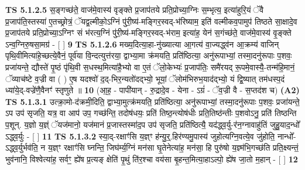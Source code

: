\documentclass[17pt]{extarticle}
\begin{document}
                  \newline
                                \textbf{ TS 5.1.2.5} \newline
                  स॒ङ्गच्छ॑ते॒ वाज॑मे॒वास्य॑ वृङ्क्ते प्र॒जाप॑तये प्रति॒प्रोच्या॒ग्निः स॒म्भृत्य॒ इत्या॑हुरि॒यं ॅवै प्र॒जाप॑ति॒स्तस्या॑ ए॒तच्छ्रोत्रं॒ ॅयद्व॒ल्मीको॒ऽग्निं पु॑री॒ष्य॑-मङ्गिर॒स्वद्-भ॑रिष्याम॒ इति॑ वल्मीकव॒पामुप॑ तिष्ठते सा॒क्षादे॒व प्र॒जाप॑तये प्रति॒प्रोच्या॒ऽग्निꣳ सं भ॑रत्य॒ग्निं पु॑री॒ष्य॑-मङ्गिर॒स्वद्-भ॑राम॒ इत्या॑ह॒ येन॑ स॒गंच्छ॑ते॒ वाज॑मे॒वास्य॑ वृ॒ङ्क्ते ऽन्व॒ग्निरु॒षसा॒मग्र॑ - [  ] \textbf{  9} \newline
                  \newline
                                \textbf{ TS 5.1.2.6} \newline
                  मख्य॒दित्या॒हा-नु॑ख्यात्या आ॒गत्य॑ वा॒ज्यद्ध्व॑न आ॒क्रम्य॑ वाजिन् पृथि॒वीमित्या॑हे॒च्छत्ये॒वैनं॒ पूर्व॑या वि॒न्दत्युत्त॑रया॒ द्वाभ्या॒मा क्र॑मयति॒ प्रति॑ष्ठित्या॒ अनु॑रूपाभ्यां॒ तस्मा॒दनु॑रूपाः प॒शवः॒ प्रजा॑यन्ते॒ द्यौस्ते॑ पृ॒ष्ठं पृ॑थि॒वी स॒धस्थ॒मित्या॑है॒भ्यो वा ए॒तं ॅलो॒केभ्यः॑ प्र॒जाप॑तिः॒ समै॑रयद् रू॒पमे॒वास्यै॒-तन्म॑हि॒मानं॒ ॅव्याच॑ष्टे व॒ज्री वा ( ) ए॒ष यदश्वो॑ द॒द्-भिर॒न्यतो॑दद्भ्यो॒ भूयां॒ ॅलोम॑भिरुभ॒याद॑द्भ्यो॒ यं द्वि॒ष्यात् तम॑धस्प॒दं ध्या॑ये॒द्-वज्रे॑णै॒वैनꣳ॑ स्तृणुते ॥ \textbf{  10 } \newline
                  \newline
                      (आ॒ह॒ - पापी॑यान् - रु॒द्रादे॒व - येना - ऽग्रं॑ - ॅव॒ज्री वै - स॒प्तद॑श च)  \textbf{(A2)} \newline \newline
                                        \textbf{ TS 5.1.3.1} \newline
                  उत्क्रा॒मो-द॑क्रमी॒दिति॒ द्वाभ्या॒मुत्क्र॑मयति॒ प्रति॑ष्ठित्या॒ अनु॑रूपाभ्यां॒ तस्मा॒दनु॑रूपाः प॒शवः॒ प्रजा॑यन्ते॒ ऽप उप॑ सृजति॒ यत्र॒ वा आप॑ उप॒ गच्छ॑न्ति॒ तदोष॑धयः॒ प्रति॑ तिष्ठ॒न्त्योष॑धीः प्रति॒तिष्ठ॑न्तीः प॒शवोऽनु॒ प्रति॑ तिष्ठन्ति प॒शून्. य॒ज्ञो य॒ज्ञ्ं ॅयज॑मानो॒ यज॑मानं प्र॒जास्तस्मा॑द॒प उप॑ सृजति॒ प्रति॑ष्ठित्यै॒ यद॑द्ध्व॒र्यु-र॑न॒ग्नावाहु॑तिं जुहु॒याद॒न्धो᳚ ऽद्ध्व॒र्युः - [  ] \textbf{  11} \newline
                  \newline
                                \textbf{ TS 5.1.3.2} \newline
                  स्या॒द्-रक्षाꣳ॑सि य॒ज्ञ्ꣳ ह॑न्यु॒र्॒.हिर॑ण्यमु॒पास्य॑ जुहोत्यग्नि॒वत्ये॒व जु॑होति॒ नान्धो᳚-ऽद्ध्व॒र्युर्भव॑ति॒ न य॒ज्ञ्ꣳ रक्षाꣳ॑सि घ्नन्ति॒ जिघ॑र्म्य॒ग्निं मन॑सा घृ॒तेनेत्या॑ह॒ मन॑सा॒ हि पुरु॑षो य॒ज्ञ्म॑भि॒गच्छ॑ति प्रति॒क्ष्यन्तं॒ भुव॑नानि॒ विश्वेत्या॑ह॒ सर्वꣳ॒॒ ह्ये॑ष प्र॒त्यङ् क्षेति॑ पृ॒थुं ति॑र॒श्चा वय॑सा बृ॒हन्त॒मित्या॒हाऽल्पो॒ ह्ये॑ष जा॒तो म॒हान् - [  ] \textbf{  12} \newline
\end{document}
